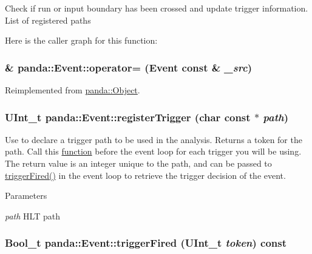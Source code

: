 Check if run or input boundary has been crossed and update trigger information. List of registered paths 

Here is the caller graph for this function:\hypertarget{classpanda_1_1Event_a8b69d2507d829f979c498807a14cd4a6}{
\subsubsection[{operator=}]{ \& panda::Event::operator= ({\bf Event} const \& {\em \_\-src})}}
\label{classpanda_1_1Event_a8b69d2507d829f979c498807a14cd4a6}


Reimplemented from \hyperlink{classpanda_1_1Object_a083629646c455db50ea99b994aac3b7b}{panda::Object}.\hypertarget{classpanda_1_1Event_aa677c9bdbd32efd3652269efbfa9b659}{
\subsubsection[{registerTrigger}]{\setlength{\rightskip}{0pt plus 5cm}UInt\_\-t panda::Event::registerTrigger (char const $\ast$ {\em path})}}
\label{classpanda_1_1Event_aa677c9bdbd32efd3652269efbfa9b659}


Use to declare a trigger path to be used in the analysis. Returns a token for the path. Call this \hyperlink{namespacepanda_1_1function}{function} before the event loop for each trigger you will be using. The return value is an integer unique to the path, and can be passed to \hyperlink{classpanda_1_1Event_acd59c2cd1de4db37626f6b6f9a371a63}{triggerFired()} in the event loop to retrieve the trigger decision of the event.


\begin{DoxyParams}{Parameters}
\item[{\em path}]HLT path \end{DoxyParams}
\hypertarget{classpanda_1_1Event_acd59c2cd1de4db37626f6b6f9a371a63}{
\subsubsection[{triggerFired}]{\setlength{\rightskip}{0pt plus 5cm}Bool\_\-t panda::Event::triggerFired (UInt\_\-t {\em token}) const}}
\label{classpanda_1_1Event_acd59c2cd1de4db37626f6b6f9a371a63}


